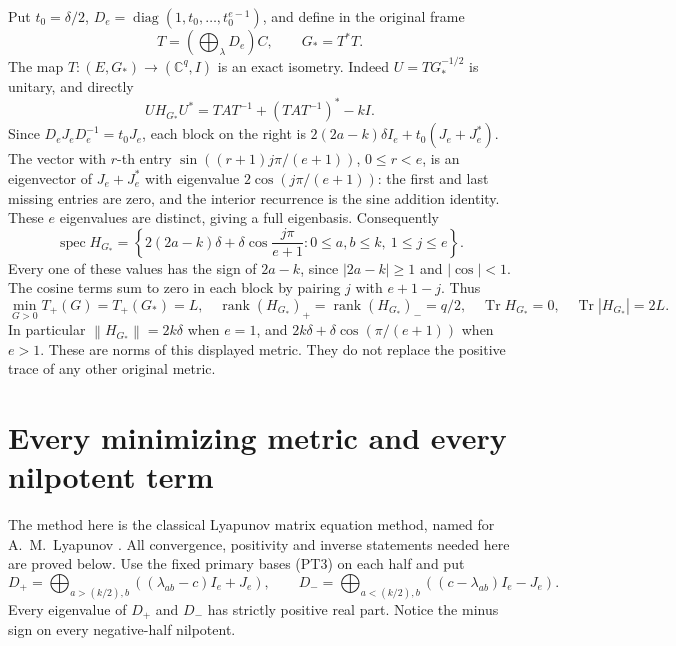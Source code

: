 \documentclass[11pt]{article}
\newcommand{\C}{\mathbb C}
\newcommand{\norm}[1]{\left\lVert#1\right\rVert}
\DeclareMathOperator{\Tr}{Tr}
\DeclareMathOperator{\rank}{rank}
\DeclareMathOperator{\diag}{diag}
\DeclareMathOperator{\spec}{spec}
\begin{document}
Put \(t_0=\delta/2\), \(D_e=\diag(1,t_0,\ldots,t_0^{e-1})\),
and define in the original frame
\begin{equation}\tag{PT10}
 T=\left(\bigoplus_\lambda D_e\right)C,\qquad G_*=T^*T.
\end{equation}
The map \(T:(E,G_*)\to(\C^q,I)\) is an exact isometry.
Indeed \(U=TG_*^{-1/2}\) is unitary, and directly
\[
 UH_{G_*}U^*=TAT^{-1}+(TAT^{-1})^*-kI.
\]
Since \(D_eJ_eD_e^{-1}=t_0J_e\), each block on the right is
\(2(2a-k)\delta I_e+t_0(J_e+J_e^*)\). The vector with
\(r\)-th entry \(\sin((r+1)j\pi/(e+1))\), \(0\le r<e\),
is an eigenvector of \(J_e+J_e^*\) with eigenvalue
\(2\cos(j\pi/(e+1))\): the first and last missing entries are
zero, and the interior recurrence is the sine addition identity.
These \(e\) eigenvalues are distinct, giving a full eigenbasis.
Consequently
\begin{equation}\tag{PT11}
 \spec H_{G_*}
 =\left\{2(2a-k)\delta+\delta\cos\frac{j\pi}{e+1}:
 0\le a,b\le k,\ 1\le j\le e\right\}.
\end{equation}
Every one of these values has the sign of \(2a-k\), since
\(|2a-k|\ge1\) and \(|\cos|<1\). The cosine terms sum to
zero in each block by pairing \(j\) with \(e+1-j\). Thus
\begin{equation}\tag{PT12}
 \min_{G>0}T_+(G)=T_+(G_*)=L,\quad
 \rank(H_{G_*})_+=\rank(H_{G_*})_-=q/2,\quad
 \Tr H_{G_*}=0,\quad\Tr|H_{G_*}|=2L.
\end{equation}
In particular \(\norm{H_{G_*}}=2k\delta\) when \(e=1\),
and \(2k\delta+\delta\cos(\pi/(e+1))\) when \(e>1\).
These are norms of this displayed metric. They do not replace
the positive trace of any other original metric.

\section{Every minimizing metric and every nilpotent term}

The method here is the classical Lyapunov matrix equation method,
named for A.~M.~Lyapunov \cite{lyapunov}. All convergence,
positivity and inverse statements needed here are proved below.
Use the fixed primary bases (PT3) on each half and put
\begin{equation}\tag{PT13}
 D_+=\bigoplus_{a>(k/2),b}( (\lambda_{ab}-c)I_e+J_e),\qquad
 D_-=\bigoplus_{a<(k/2),b}( (c-\lambda_{ab})I_e-J_e).
\end{equation}
Every eigenvalue of \(D_+\) and \(D_-\) has strictly positive
real part. Notice the minus sign on every negative-half nilpotent.
\end{document}
